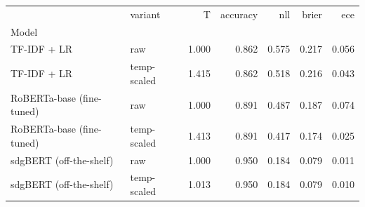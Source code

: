 \begin{tabular}{llrrrrr}
\toprule
 & variant & T & accuracy & nll & brier & ece \\
Model &  &  &  &  &  &  \\
\midrule
TF-IDF + LR & raw & 1.000 & 0.862 & 0.575 & 0.217 & 0.056 \\
TF-IDF + LR & temp-scaled & 1.415 & 0.862 & 0.518 & 0.216 & 0.043 \\
RoBERTa-base (fine-tuned) & raw & 1.000 & 0.891 & 0.487 & 0.187 & 0.074 \\
RoBERTa-base (fine-tuned) & temp-scaled & 1.413 & 0.891 & 0.417 & 0.174 & 0.025 \\
sdgBERT (off-the-shelf) & raw & 1.000 & 0.950 & 0.184 & 0.079 & 0.011 \\
sdgBERT (off-the-shelf) & temp-scaled & 1.013 & 0.950 & 0.184 & 0.079 & 0.010 \\
\bottomrule
\end{tabular}
